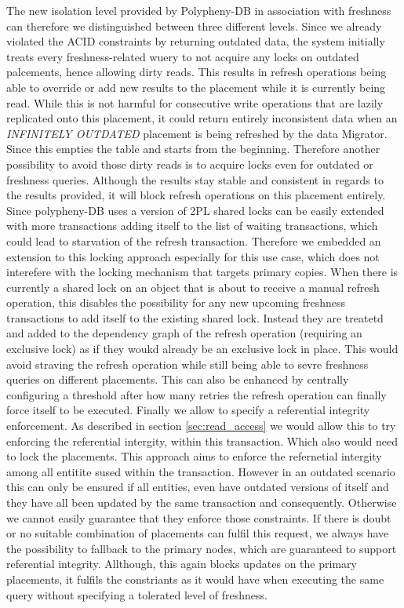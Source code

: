 The new isolation level provided by Polypheny-DB in association with freshness can therefore we distinguished between three different levels.
Since we already violated the ACID constraints by returning outdated data, the system initially treats every freshness-related wuery to not acquire any locks on outdated palcements, 
hence allowing dirty reads. This results in refresh operations being able to override or add new results to the placement while it is currently being read. 
While this is not harmful for consecutive write operations that are lazily replicated onto this placement, it could return entirely inconsistent data when 
an \emph{INFINITELY OUTDATED} placement is being refreshed by the data Migrator. Since this empties the table and starts from the beginning. 
Therefore another possibility to avoid those dirty reads is to acquire locks even for outdated or freshness queries. Although the results stay stable and consistent in regards to
the results provided, it will block refresh operations on this placement entirely. Since polypheny-DB uses a version of 2PL shared locks can be easily extended with more transactions adding
itself to the list of waiting transactions, which could lead to starvation of the refresh transaction. Therefore we embedded an extension to this locking approach especially for this use case, which does not interefere with 
the locking mechanism that targets primary copies. When there is currently a shared lock on an object that is about to receive a manual refresh operation, this disables the possibility
for any new upcoming freshness transactions to add itself to the existing shared lock. Instead they are treatetd and added to the dependency graph of the refresh operation (requiring an exclusive lock)
as if they woukd already be an exclusive lock in place. This would avoid straving the refresh operation while still being able to sevre freshness queries on different placements.
This can also be enhanced by centrally configuring  a threshold after how many retries the refresh operation can finally force itself to be executed.
Finally we allow to specify a referential integrity enforcement. As described in section \ref{sec:read_access} we would allow this to try enforcing the referential intergity,
within this transaction. Which also would need to lock the placements. This approach aims to enforce the refernetial intergity among all entitite sused within the transaction.
However in an outdated scenario this can only be ensured if all entities, even have outdated versions of itself and they have all been updated by the same 
transaction and consequently. Otherwise we cannot easily guarantee that they enforce those constraints. If there is doubt or no suitable combination of placements can fulfil this request,
we always have the possibility to fallback to the primary nodes, which are guaranteed to support referential integrity. Allthough, this again blocks updates on the primary placements,
it fulfils the constriants as it would have when executing the same query without specifying a tolerated level of freshness.
